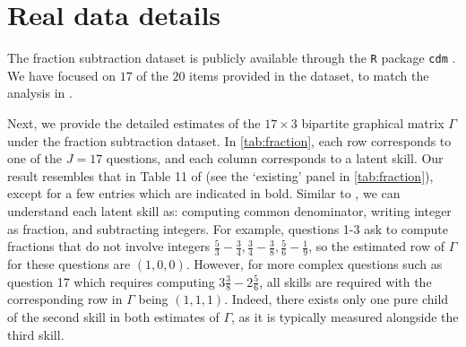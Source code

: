 \documentclass[10pt]{article} %
\begin{document}
\section{Real data details}\label{sec:real data details}
The fraction subtraction dataset is publicly available through the \texttt{R} package \texttt{cdm} \citep{george2016r}. We have focused on $17$ of the $20$ items provided in the dataset, to match the analysis in \cite{chen2015statistical}.

Next, we provide the detailed estimates of the $17 \times 3$ bipartite graphical matrix $\Gamma$ under the fraction subtraction dataset. In \cref{tab:fraction}, each row corresponds to one of the $J = 17$ questions, and each column corresponds to a latent skill. Our result resembles that in Table 11 of \cite{chen2015statistical} (see the `existing' panel in \cref{tab:fraction}), except for a few entries which are indicated in bold. Similar to \cite{chen2015statistical}, we can understand each latent skill as: computing common denominator, writing integer as fraction, and subtracting integers. For example, questions 1-3 ask to compute fractions that do not involve integers $\frac{5}{3} - \frac{3}{4}, \frac{3}{4} - \frac{3}{8}, \frac{5}{6}-\frac{1}{9}$, so the estimated row of $\Gamma$ for these questions are $(1,0,0)$. However, for more complex questions such as question 17 which requires computing $3 \frac{3}{8} - 2 \frac{5}{6}$, all skills are required with the corresponding row in $\Gamma$ being $(1,1,1)$. Indeed, there exists only one pure child of the second skill in both estimates of $\Gamma$, as it is typically measured alongside the third skill.
\end{document}
